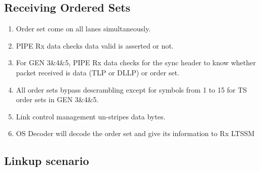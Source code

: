 \subsection{Receiving Ordered Sets}
\begin{enumerate}
  \item Order set come on all lanes simultaneously.
  \item PIPE Rx data checks data valid is asserted or not.
  \item For GEN 3\&4\&5, PIPE Rx data checks for the sync header to know whether packet received is data (TLP or DLLP) or order set.
  \item All order sets bypass descrambling except for symbols from 1 to 15 for TS order sets in GEN 3\&4\&5.
  \item Link control management un-stripes data bytes.
  \item OS Decoder will decode the order set and give its information to Rx LTSSM
\end{enumerate}
\subsection{Linkup scenario}

